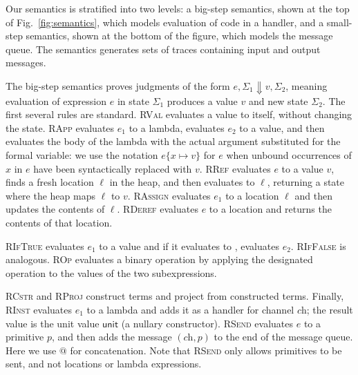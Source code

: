 \documentclass{entcs} \usepackage{entcsmacro}
\newcommand{\code}[1]{\text{\lstinline!#1!}}
\newcommand{\aset}[1]{\{#1\}}
\newcommand{\sfmt}[1]{\textsf{#1}}
\newcommand{\sch}{\textit{ch}}
\newcommand{\loc}{\ell}
\newcommand{\sunit}{\sfmt{unit}}
\newcommand{\sreduce}{\Downarrow}
\newcommand{\xv}{p}
\newcommand{\comment}[3][\color{red}]{{#1{[{#2}: {#3}]}}}
\newcommand{\kris}[1]{\comment[\color{orange}]{kris}{#1}}
\newcommand{\mrc}[1]{\comment[\color{blue}]{MRC}{#1}}
\begin{document}
Our semantics is stratified into two levels: a big-step semantics,
shown at the top of Fig.~\ref{fig:semantics}, which models evaluation of code in a
handler, and a small-step semantics, shown at the bottom of the
figure, which models the message queue.  The semantics generates sets
of traces containing input and output messages.


The big-step semantics proves judgments of the form
$e, \Sigma_1 \sreduce v, \Sigma_2$, meaning
evaluation of expression $e$ in state $\Sigma_1$ produces a value $v$ and
new state $\Sigma_2$. 
The first several rules are standard.
\textsc{RVal} evaluates a value to itself, without changing the
state. \textsc{RApp} evaluates $e_1$ to a lambda, evaluates $e_2$ to
a value, and then evaluates the body of the lambda with the actual
argument substituted for the formal variable: we use the notation
$e\aset{x\mapsto v}$ for $e$ when unbound occurrences of $x$ in $e$
have been syntactically replaced with $v$. 
\textsc{RRef} evaluates $e$ to a value $v$, finds a fresh location
$\loc$ in the heap, and then evaluates to $\loc$, returning a state
where the heap maps $\loc$ to $v$. \textsc{RAssign} evaluates $e_1$
to a location $\loc$ and then updates the contents of
$\loc$. \textsc{RDeref} evaluates $e$ to a location and returns the
contents of that location.

\textsc{RIfTrue} evaluates $e_1$ to a value and if it evaluates to
\code{true}, evaluates $e_2$. \textsc{RIfFalse} is
analogous.
\textsc{ROp} evaluates a binary operation by applying the designated
operation to the values of the two subexpressions.

\textsc{RCstr} and \textsc{RProj} construct terms and project from
constructed terms. Finally, \textsc{RInst} evaluates $e_1$ to a lambda
and adds it as a handler for channel $\sch$; the result value is the
unit value $\sunit$ (a nullary constructor). \textsc{RSend} evaluates
$e$ to a primitive $\xv$, and then adds the message $(\sch,\xv)$ to the
end of the message queue. Here we use $@$ for concatenation. Note that \textsc{RSend} only allows
primitives to be sent, and not locations or lambda
expressions.
\end{document}
